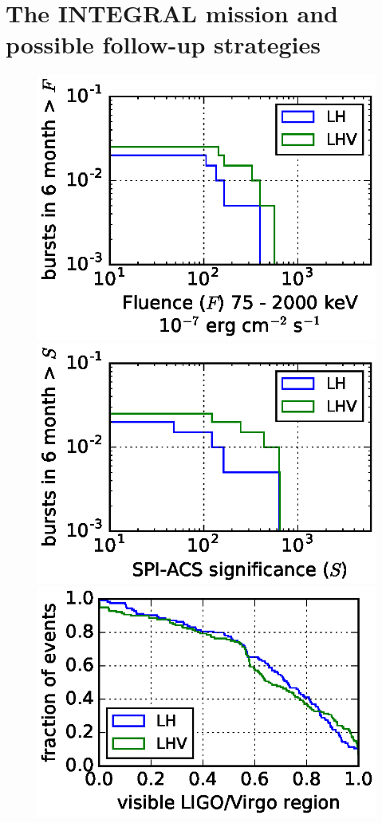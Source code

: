 \documentclass[11pt]{article}
\begin{document}
\section*{The INTEGRAL mission and possible follow-up strategies}

\begin{figure}
  \centering
    \includegraphics[scale=.6]{P7-1_f1.eps}
    \includegraphics[scale=.6]{P7-1_f2.eps}\\
    \includegraphics[scale=.6]{P7-1_f3.eps}

\end{figure}
\end{document}
